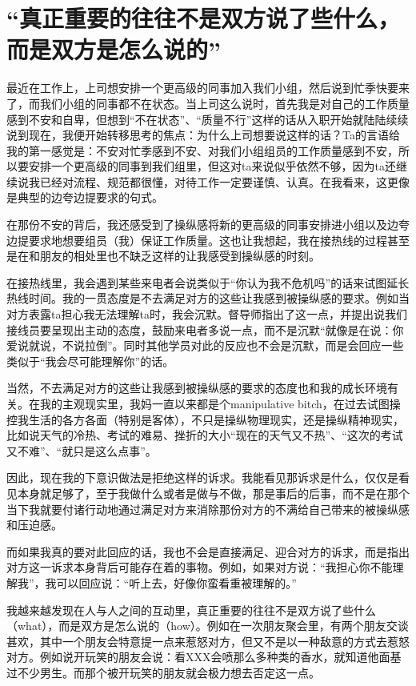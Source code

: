 \chapter{“真正重要的往往不是双方说了些什么，而是双方是怎么说的”}




最近在工作上，上司想安排一个更高级的同事加入我们小组，然后说到忙季快要来了，而我们小组的同事都不在状态。当上司这么说时，首先我是对自己的工作质量感到不安和自卑，但想到“不在状态”、“质量不行”这样的话从入职开始就陆陆续续说到现在，我便开始转移思考的焦点：为什么上司想要说这样的话？Ta的言语给我的第一感觉是：不安\pozhehao{}对忙季感到不安、对我们小组组员的工作质量感到不安，所以要安排一个更高级的同事到我们组里，但这对ta来说似乎依然不够，因为ta还继续说我已经对流程、规范都很懂，对待工作一定要谨慎、认真。在我看来，这更像是典型的边夸边提要求的句式。

在那份不安的背后，我还感受到了操纵感\pozhehao{}将新的更高级的同事安排进小组以及边夸边提要求地想要组员（我）保证工作质量。这也让我想起，我在接热线的过程甚至是在和朋友的相处里也不缺乏这样的让我感受到操纵感的时刻。

在接热线里，我会遇到某些来电者会说类似于“你认为我不危机吗”的话来试图延长热线时间。我的一贯态度是不去满足对方的这些让我感到被操纵感的要求。例如当对方表露ta担心我无法理解ta时，我会沉默。督导师指出了这一点，并提出说我们接线员要呈现出主动的态度，鼓励来电者多说一点，而不是沉默\pozhehao{}“就像是在说：你爱说就说，不说拉倒”。同时其他学员对此的反应也不会是沉默，而是会回应一些类似于“我会尽可能理解你”的话。

当然，不去满足对方的这些让我感到被操纵感的要求的态度也和我的成长环境有关。在我的主观现实里，我妈一直以来都是个manipulative bitch，在过去试图操控我生活的各方各面（特别是客体），不只是操纵物理现实，还是操纵精神现实，比如说天气的冷热、考试的难易、挫折的大小\pozhehao{}“现在的天气又不热”、“这次的考试又不难”、“就只是这么点事”。

因此，现在我的下意识做法是拒绝这样的诉求。我能看见那诉求是什么，仅仅是看见本身就足够了，至于我做什么或者是做与不做，那是事后的后事，而不是在那个当下我就要付诸行动地通过满足对方来消除那份对方的不满给自己带来的被操纵感和压迫感。

而如果我真的要对此回应的话，我也不会是直接满足、迎合对方的诉求，而是指出对方这一诉求本身背后可能存在着的事物。例如，如果对方说：“我担心你不能理解我”，我可以回应说：“听上去，好像你蛮看重被理解的。”

我越来越发现在人与人之间的互动里，真正重要的往往不是双方说了些什么（what），而是双方是怎么说的（how）。例如在一次朋友聚会里，有两个朋友交谈甚欢，其中一个朋友会特意提一点来惹怒对方，但又不是以一种敌意的方式去惹怒对方。例如说开玩笑的朋友会说：看XXX会喷那么多种类的香水，就知道他面基过不少男生。而那个被开玩笑的朋友就会极力想去否定这一点。

